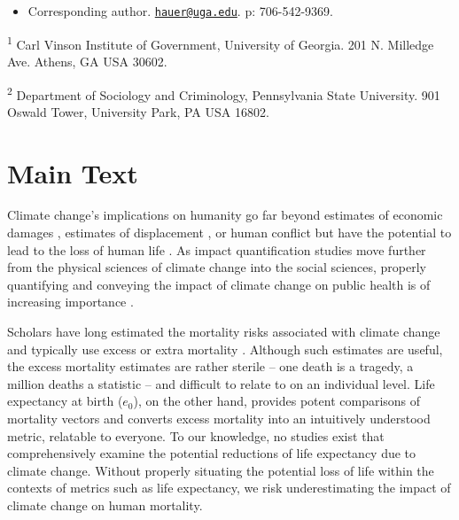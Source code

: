 \documentclass[12pt,]{article}
\providecommand{\tightlist}{%
\setlength{\itemsep}{0pt}\setlength{\parskip}{0pt}}
\begin{document}
\vskip 6.5pt


\noindent \doublespacing \begin{itemize}
\tightlist
\item
  Corresponding author.
  \href{mailto:hauer@uga.edu}{\nolinkurl{hauer@uga.edu}}. p:
  706-542-9369.
\end{itemize}

\textsuperscript{1} Carl Vinson Institute of Government, University of
Georgia. 201 N. Milledge Ave. Athens, GA USA 30602.

\textsuperscript{2} Department of Sociology and Criminology,
Pennsylvania State University. 901 Oswald Tower, University Park, PA USA
16802.

\newpage

\section{Main Text}\label{main-text}

Climate change's implications on humanity go far beyond estimates of
economic damages \citep{hsiang2017estimating}, estimates of displacement
\citep{rigaud2018groundswell}, or human conflict
\citep{barnett2007climate} but have the potential to lead to the loss of
human life \citep{forzieri2017increasing, pachauri2014climate}. As
impact quantification studies move further from the physical sciences of
climate change into the social sciences, properly quantifying and
conveying the impact of climate change on public health is of increasing
importance \citep{melillo2014climate, cloyd2016engagement}.

Scholars have long estimated the mortality risks associated with climate
change and typically use excess or extra mortality
\citep{forzieri2017increasing, wilson2017climate, mcmichael2006climate, zanobetti2012summer}.
Although such estimates are useful, the excess mortality estimates are
rather sterile -- one death is a tragedy, a million deaths a statistic
-- and difficult to relate to on an individual level. Life expectancy at
birth (\(e_0\)), on the other hand, provides potent comparisons of
mortality vectors and converts excess mortality into an intuitively
understood metric, relatable to everyone. To our knowledge, no studies
exist that comprehensively examine the potential reductions of life
expectancy due to climate change. Without properly situating the
potential loss of life within the contexts of metrics such as life
expectancy, we risk underestimating the impact of climate change on
human mortality.
\end{document}
